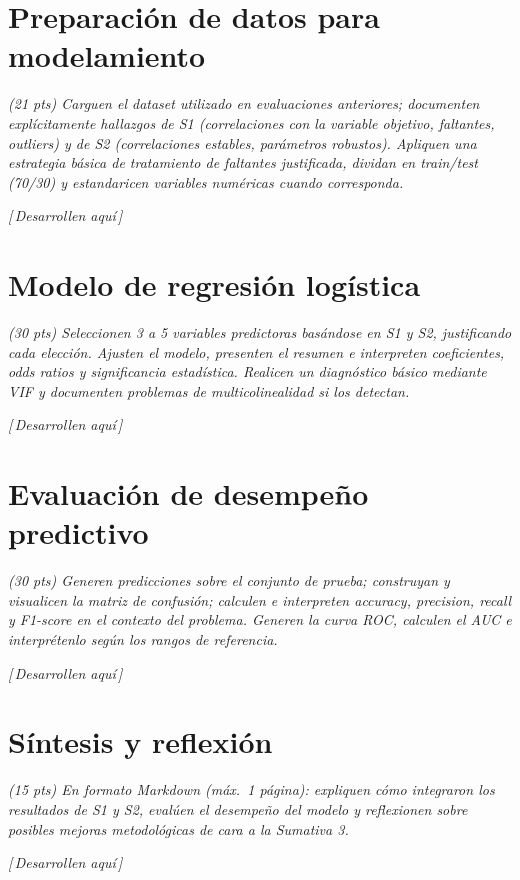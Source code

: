 \documentclass[11pt,a4paper]{article}
\newcommand{\guia}[1]{{\small\itshape\color{gris}#1}\par\vspace{0.15em}}
\newcommand{\resp}{{\footnotesize\itshape\color{fillgray}[\,Desarrollen aquí\,]}\par\vspace{1.1em}}
\begin{document}
\vspace{0.5em}
\tableofcontents
\newpage

\section{Preparación de datos para modelamiento}
\guia{(21 pts) Carguen el dataset utilizado en evaluaciones anteriores; documenten explícitamente hallazgos de S1 (correlaciones con la variable objetivo, faltantes, outliers) y de S2 (correlaciones estables, parámetros robustos). Apliquen una estrategia básica de tratamiento de faltantes justificada, dividan en train/test (70/30) y estandaricen variables numéricas cuando corresponda.}
\resp

\section{Modelo de regresión logística}
\guia{(30 pts) Seleccionen 3 a 5 variables predictoras basándose en S1 y S2, justificando cada elección. Ajusten el modelo, presenten el resumen e interpreten coeficientes, odds ratios y significancia estadística. Realicen un diagnóstico básico mediante VIF y documenten problemas de multicolinealidad si los detectan.}
\resp

\section{Evaluación de desempeño predictivo}
\guia{(30 pts) Generen predicciones sobre el conjunto de prueba; construyan y visualicen la matriz de confusión; calculen e interpreten accuracy, precision, recall y F1-score en el contexto del problema. Generen la curva ROC, calculen el AUC e interprétenlo según los rangos de referencia.}
\resp

\section{Síntesis y reflexión}
\guia{(15 pts) En formato Markdown (máx.\ 1 página): expliquen cómo integraron los resultados de S1 y S2, evalúen el desempeño del modelo y reflexionen sobre posibles mejoras metodológicas de cara a la Sumativa 3.}
\resp
\end{document}
